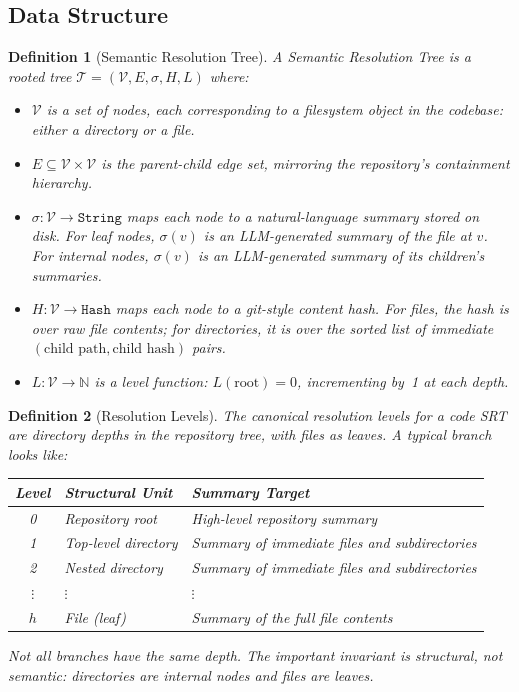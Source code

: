\documentclass[11pt,a4paper]{article}
\newtheorem{definition}{Definition}
\newcommand{\srt}{\textsc{SRT}}
\newcommand{\summ}{\sigma}
\newcommand{\tree}{\mathcal{T}}
\newcommand{\nodes}{\mathcal{V}}
\begin{document}
\subsection{Data Structure}\label{sec:definitions}

\begin{definition}[Semantic Resolution Tree]\label{def:srt}
A Semantic Resolution Tree is a rooted tree $\tree = (\nodes, E, \summ, H, L)$ where:
\begin{itemize}[nosep]
    \item $\nodes$ is a set of nodes, each corresponding to a filesystem object in the codebase: either a directory or a file.
    \item $E \subseteq \nodes \times \nodes$ is the parent-child edge set, mirroring the repository's containment hierarchy.
    \item $\summ: \nodes \to \texttt{String}$ maps each node to a natural-language summary stored on disk. For leaf nodes, $\summ(v)$ is an LLM-generated summary of the file at $v$. For internal nodes, $\summ(v)$ is an LLM-generated summary of its children's summaries.
    \item $H: \nodes \to \texttt{Hash}$ maps each node to a git-style content hash. For files, the hash is over raw file contents; for directories, it is over the sorted list of immediate $(\text{child path}, \text{child hash})$ pairs.
    \item $L: \nodes \to \mathbb{N}$ is a level function: $L(\text{root}) = 0$, incrementing by~1 at each depth.
\end{itemize}
\end{definition}

\begin{definition}[Resolution Levels]\label{def:levels}
The canonical resolution levels for a code \srt{} are directory depths in the repository tree, with files as leaves.
A typical branch looks like:
\begin{center}
\begin{tabular}{cll}
\toprule
\textbf{Level} & \textbf{Structural Unit} & \textbf{Summary Target} \\
\midrule
0 & Repository root & High-level repository summary \\
1 & Top-level directory & Summary of immediate files and subdirectories \\
2 & Nested directory & Summary of immediate files and subdirectories \\
$\vdots$ & $\vdots$ & $\vdots$ \\
$h$ & File (leaf) & Summary of the full file contents \\
\bottomrule
\end{tabular}
\end{center}
Not all branches have the same depth. The important invariant is structural, not semantic: directories are internal nodes and files are leaves.
\end{definition}
\end{document}
